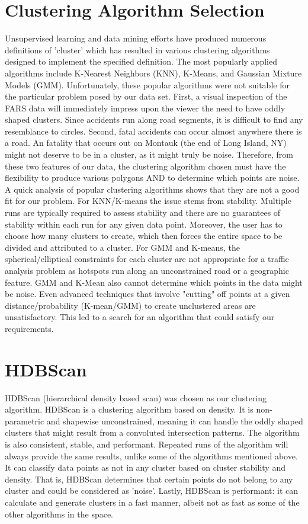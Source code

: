 \documentclass{article}
\begin{document}
\section{Clustering Algorithm Selection}
Unsupervised learning and data mining efforts have produced numerous definitions of 'cluster' which has resulted in various clustering algorithms designed to implement the specified definition. The most popularly applied algorithms include K-Nearest Neighbors (KNN), K-Means, and Gaussian Mixture Models (GMM). Unfortunately, these popular algorithms were not suitable for the particular problem posed by our data set. First, a visual inspection of the FARS data will immediately impress upon the viewer the need to have oddly shaped clusters. Since accidents run along road segments, it is difficult to find any resemblance to circles. Second, fatal accidents can occur almost anywhere there is a road. An fatality that occurs out on Montauk (the end of Long Island, NY) might not deserve to be in a cluster, as it might truly be noise. Therefore, from these two features of our data, the clustering algorithm chosen must have the flexibility to produce various polygons AND to determine which points are noise. A quick analysis of popular clustering algorithms shows that they are not a good fit for our problem. For KNN/K-means the issue stems from stability. Multiple runs are typically required to assess stability and there are no guarantees of stability within each run for any given data point. Moreover, the user has to choose how many clusters to create, which then forces the entire space to be divided and attributed to a cluster. For GMM and K-means, the spherical/elliptical constraints for each cluster are not appropriate for a traffic analysis problem as hotspots run along an unconstrained road or a geographic feature. GMM and K-Mean also cannot determine which points in the data might be noise. Even advanced techniques that involve "cutting" off points at a given distance/probability (K-mean/GMM) to create unclustered areas are unsatisfactory. This led to a search for an algorithm that could satisfy our requirements.

\section{HDBScan}
HDBScan (hierarchical density based scan) was chosen as our clustering algorithm. HDBScan is a clustering algorithm based on density. It is non-parametric and shapewise unconstrained, meaning it can handle the oddly shaped clusters that might result from a convoluted intersection patterns. The algorithm is also consistent, stable, and performant. Repeated runs of the algorithm will always provide the same results, unlike some of the algorithms mentioned above. It can classify data points as not in any cluster based on cluster stability and density. That is, HDBScan determines that certain points do not belong to any cluster and could be considered as 'noise'. Lastly, HDBScan is performant: it can calculate and generate clusters in a fast manner, albeit not as fast as some of the other algorithms in the space.
\end{document}
